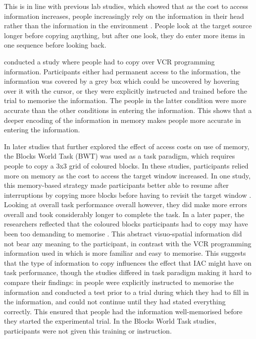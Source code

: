 This is in line with previous lab studies, which showed that as the cost to access information increases, people increasingly rely on the information in their head rather than the information in the environment \citep[e.g.][]{Gray2006, Morgan2009}. People look at the target source longer before copying anything, but after one look, they do enter more items in one sequence before looking back. 

\citet{Gray2004} conducted a study where people had to copy over VCR programming information. Participants either had permanent access to the information, the information was covered by a grey box which could be uncovered by hovering over it with the cursor, or they were explicitly instructed and trained before the trial to memorise the information. The people in the latter condition were more accurate than the other conditions in entering the information. This shows that a deeper encoding of the information in memory makes people more accurate in entering the information. 

In later studies that further explored the effect of access costs on use of memory, the Blocks World Task (BWT) was used as a task paradigm, which requires people to copy a 3x3 grid of coloured blocks. In these studies, participants relied more on memory as the cost to access the target window increased. In one study, this memory-based strategy made participants better able to resume after interruptions by copying more blocks before having to revisit the target window \citep{Morgan2009}. Looking at overall task performance overall however, they did make more errors overall and took considerably longer to complete the task. In a later paper, the researchers reflected that the coloured blocks participants had to copy may have been too demanding to memorise \citep{Waldron2011}. This abstract visuo-spatial information did not bear any meaning to the participant, in contrast with the VCR programming information used in \citet{Gray2004} which is more familiar and easy to memorise. This suggests that the type of information to copy influences the effect that IAC might have on task performance, though the studies differed in task paradigm making it hard to compare their findings: in \citet{Gray2004} people were explicitly instructed to memorise the information and conducted a test prior to a trial during which they had to fill in the information, and could not continue until they had stated everything correctly. This ensured that people had the information well-memorised before they started the experimental trial. In the Blocks World Task studies, participants were not given this training or instruction.

